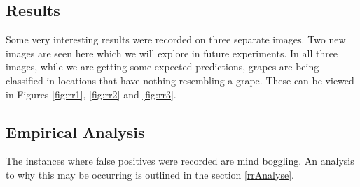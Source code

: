 \subsection*{Results}
Some very interesting results were recorded on three separate images. Two new images are seen
here which we will explore in future experiments. In all three images, while we
are getting some expected predictions, grapes are being classified in locations
that have nothing resembling a grape. These can be viewed in Figures
\ref{fig:rr1}, \ref{fig:rr2} and \ref{fig:rr3}.

\subsection*{Empirical Analysis}
The instances where false positives were recorded are mind boggling.
An analysis to why this may be occurring is outlined in the section \ref{rrAnalyse}.
